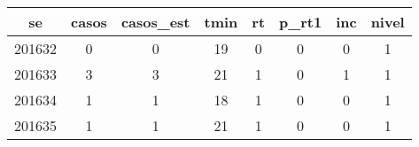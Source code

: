 \begin{tabular}{c|ccccccc}
  \hline
se & casos & casos\_est & tmin & rt & p\_rt1 & inc & nivel \\ 
  \hline
201632 & 0 & 0 & 19 & 0 & 0 & 0 & 1 \\ 
  201633 & 3 & 3 & 21 & 1 & 0 & 1 & 1 \\ 
  201634 & 1 & 1 & 18 & 1 & 0 & 0 & 1 \\ 
  201635 & 1 & 1 & 21 & 1 & 0 & 0 & 1 \\ 
   \hline
\end{tabular}
